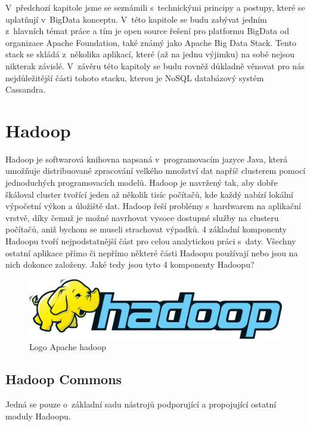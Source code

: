 V~předchozí kapitole jsme se seznámili s~technickými principy a postupy, které se uplatňují v~BigData konceptu. V~této kapitole se budu zabývat jedním z~hlavních témat práce a tím je open source řešení pro platformu BigData od organizace Apache Foundation, také známý jako Apache Big Data Stack. Tento stack se skládá z~několika aplikací, které (až na jednu výjimku) na sobě nejsou nikterak závislé. V~závěru této kapitoly se budu rovněž důkladně věnovat pro nás nejdůležitější části tohoto stacku, kterou je NoSQL databázový systém Cassandra.

\section{Hadoop}




Hadoop je softwarová knihovna napsaná v~programovacím jazyce Java, která umožňuje distribuované zpracování velkého množství dat napříč clusterem pomocí jednoduchých programovacích modelů. Hadoop je navržený tak, aby dobře škáloval cluster tvořící jeden až několik tisíc počítačů, kde každý nabízí lokální výpočetní výkon a úložiště dat. Hadoop řeší problémy s~hardwarem na aplikační vrstvě, díky čemuž je možné navrhovat vysoce dostupné služby na clusteru počítačů, aniž bychom se museli strachovat výpadků. 4 základní komponenty Hadoopu tvoří nejpodstatnější část pro celou analytickou práci s~daty. Všechny ostatní aplikace přímo či nepřímo některé části Hadoopu používají nebo jsou na nich dokonce založeny. Jaké tedy jsou tyto 4 komponenty Hadoopu?


\begin{figure}[h]
\centering
\includegraphics[scale=0.15]{images/hadoop}
\caption{Logo Apache hadoop}
\label{fig:yarn}

\end{figure}


\subsection{Hadoop Commons}
Jedná se pouze o~základní sadu nástrojů podporující a propojující ostatní moduly Hadoopu.


